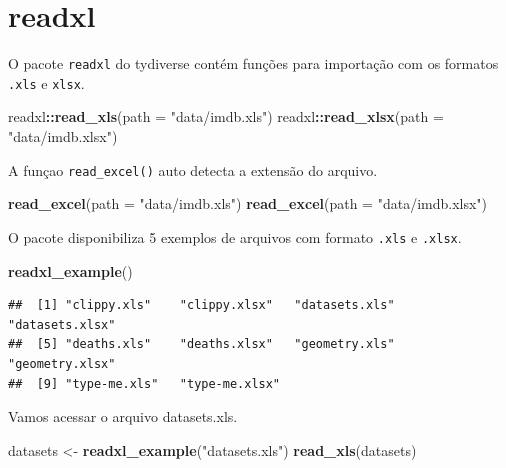 \documentclass[
]{book}
\newenvironment{Shaded}{\begin{snugshade}}{\end{snugshade}}
\newcommand{\DataTypeTok}[1]{\textcolor[rgb]{0.13,0.29,0.53}{#1}}
\newcommand{\KeywordTok}[1]{\textcolor[rgb]{0.13,0.29,0.53}{\textbf{#1}}}
\newcommand{\NormalTok}[1]{#1}
\newcommand{\OperatorTok}[1]{\textcolor[rgb]{0.81,0.36,0.00}{\textbf{#1}}}
\newcommand{\StringTok}[1]{\textcolor[rgb]{0.31,0.60,0.02}{#1}}
\begin{document}
\hypertarget{readxl}{%
\section{readxl}\label{readxl}}

O pacote \texttt{readxl} do tydiverse contém funções para importação com os formatos \texttt{.xls} e \texttt{xlsx}.

\begin{Shaded}
\begin{Highlighting}[]
\NormalTok{readxl}\OperatorTok{::}\KeywordTok{read\_xls}\NormalTok{(}\DataTypeTok{path =} \StringTok{"data/imdb.xls"}\NormalTok{)}
\NormalTok{readxl}\OperatorTok{::}\KeywordTok{read\_xlsx}\NormalTok{(}\DataTypeTok{path =} \StringTok{"data/imdb.xlsx"}\NormalTok{)}
\end{Highlighting}
\end{Shaded}

A funçao \texttt{read\_excel()} auto detecta a extensão do arquivo.

\begin{Shaded}
\begin{Highlighting}[]
\KeywordTok{read\_excel}\NormalTok{(}\DataTypeTok{path =} \StringTok{"data/imdb.xls"}\NormalTok{)}
\KeywordTok{read\_excel}\NormalTok{(}\DataTypeTok{path =} \StringTok{"data/imdb.xlsx"}\NormalTok{)}
\end{Highlighting}
\end{Shaded}

O pacote disponibiliza 5 exemplos de arquivos com formato \texttt{.xls} e \texttt{.xlsx}.

\begin{Shaded}
\begin{Highlighting}[]
\KeywordTok{readxl\_example}\NormalTok{()}
\end{Highlighting}
\end{Shaded}

\begin{verbatim}
##  [1] "clippy.xls"    "clippy.xlsx"   "datasets.xls"  "datasets.xlsx"
##  [5] "deaths.xls"    "deaths.xlsx"   "geometry.xls"  "geometry.xlsx"
##  [9] "type-me.xls"   "type-me.xlsx"
\end{verbatim}

Vamos acessar o arquivo datasets.xls.

\begin{Shaded}
\begin{Highlighting}[]
\NormalTok{datasets <{-}}\StringTok{ }\KeywordTok{readxl\_example}\NormalTok{(}\StringTok{"datasets.xls"}\NormalTok{)}
\KeywordTok{read\_xls}\NormalTok{(datasets)}
\end{Highlighting}
\end{Shaded}
\end{document}
